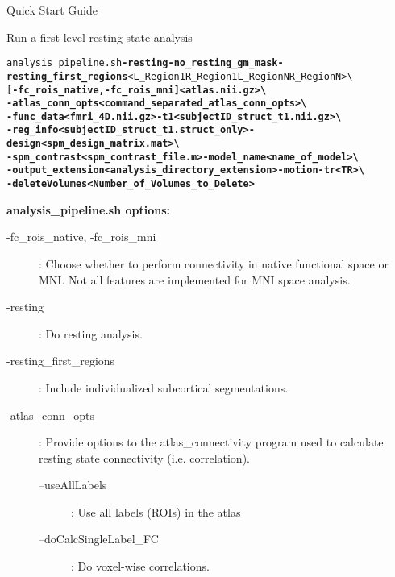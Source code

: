 \documentclass[]{report}
\begin{document}
\begin{chapter}{Quick Start Guide }
\begin{section}{Run a first level resting state analysis}
\
\begin{alltt}
analysis\_pipeline.sh  {\bf-resting  -no_resting_gm_mask -resting\_first\_regions } <L_Region1 R_Region1 L_RegionN R_RegionN>  \textbackslash \\
\hspace*{0.5in}  [ \bf-fc\_rois\_native, -fc\_rois\_mni ]  <atlas.nii.gz>  \textbackslash \\
\hspace*{0.5in}  {\bf -atlas\_conn\_opts } <command\_separated\_atlas\_conn\_opts>  \textbackslash \\
\hspace*{0.5in}  -func\_data <fmri\_4D.nii.gz>   -t1 <subjectID\_struct\_t1.nii.gz>  \textbackslash \\
\hspace*{0.5in} -reg\_info <subjectID\_struct\_t1.struct\_only> -design <spm\_design\_matrix.mat> \textbackslash  \\
\hspace*{0.5in} -spm\_contrast  <spm\_contrast\_file.m> -model\_name <name\_of\_model> \textbackslash   \\
\hspace*{0.5in} -output\_extension <analysis\_directory\_extension>  -motion -tr <TR> \textbackslash  \\
\hspace*{0.5in} -deleteVolumes <Number\_of\_Volumes\_to\_Delete>
\end{alltt}
\begin{subsubsection}{\bf analysis\_pipeline.sh options: }
\begin{description} 
	\item [-fc\_rois\_native, -fc\_rois\_mni  ]  : Choose whether to perform connectivity in native functional space or MNI. Not all features are implemented for MNI space analysis.
	\item [-resting] :  Do resting analysis.
	\item [-resting\_first\_regions ] : Include individualized subcortical segmentations.
	\item [ -atlas\_conn\_opts ] : Provide options to the atlas\_connectivity program used to calculate resting state connectivity (i.e. correlation).
	\begin{description}
	\item [--useAllLabels  ]  : Use all labels (ROIs) in the atlas
	\item [--doCalcSingleLabel\_FC] :  Do voxel-wise correlations.
	\end{description}


\end{description}
\end{subsubsection}
\end{section}
\end{chapter}
\end{document}
